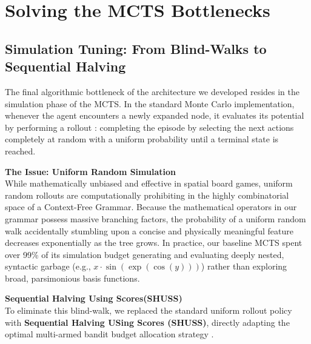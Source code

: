 \documentclass[11pt, a4paper]{article}
\begin{document}
\section{Solving the MCTS Bottlenecks}

\subsection{Simulation Tuning: From Blind-Walks to Sequential Halving}

The final algorithmic bottleneck of the architecture we developed resides in the simulation phase of the MCTS. In the standard Monte Carlo implementation, whenever the agent encounters a newly expanded node, it evaluates its potential by performing a rollout : completing the episode by selecting the next actions completely at random with a uniform probability until a terminal state is reached.

\vspace{0.3cm}
\noindent \textbf{The Issue: Uniform Random Simulation}\\
While mathematically unbiased and effective in spatial board games, uniform random rollouts are computationally prohibiting in the highly combinatorial space of a Context-Free Grammar. Because the mathematical operators in our grammar possess massive branching factors, the probability of a uniform random walk accidentally stumbling upon a concise and physically meaningful feature decreases exponentially as the tree grows. In practice, our baseline MCTS spent over 99\% of its simulation budget generating and evaluating deeply nested, syntactic garbage (e.g., $x \cdot \sin(\exp(\cos(y)))$) rather than exploring broad, parsimonious basis functions.

\vspace{0.3cm}
\noindent \textbf{Sequential Halving Using Scores(SHUSS)}\\
To eliminate this blind-walk, we replaced the standard uniform rollout policy with \textbf{Sequential Halving USing Scores (SHUSS)}, directly adapting the optimal multi-armed bandit budget allocation strategy \cite{cazenave2022SHUSS}. 
\end{document}

